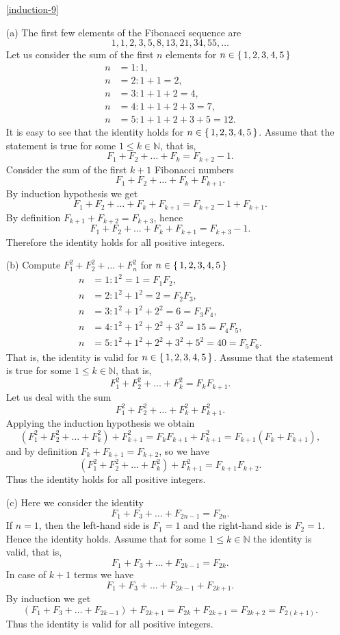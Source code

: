 \begin{enumerate}
\item[\ref{induction-9}]

(a) The first few elements of the Fibonacci sequence are
$$
1,1,2,3,5,8,13,21,34,55,\ldots
$$
Let us consider the sum of the first $n$ elements for $n\in\left\{\,1,2,3,4,5\,\right\}$
\begin{align*}
n&=1: 1,\\
n&=2: 1+1=2,\\
n&=3: 1+1+2=4,\\
n&=4: 1+1+2+3=7,\\
n&=5: 1+1+2+3+5=12.
\end{align*}
It is easy to see that the identity holds for $n\in\left\{\,1,2,3,4,5\,\right\}$. Assume that the statement is true for some $1\leq k\in\mathbb{N}$,
that is, 
$$
F_1+F_2+\ldots+F_k=F_{k+2}-1.
$$
Consider the sum of the first $k+1$ Fibonacci numbers
$$
F_1+F_2+\ldots+F_k+F_{k+1}.
$$
By induction hypothesis we get
$$
F_1+F_2+\ldots+F_k+F_{k+1}=F_{k+2}-1+F_{k+1}.
$$
By definition $F_{k+1}+F_{k+2}=F_{k+3}$, hence
$$
F_1+F_2+\ldots+F_k+F_{k+1}=F_{k+3}-1.
$$
Therefore the identity holds for all positive integers.

(b) Compute $F_1^2+F_2^2+\ldots+F_n^2$ for $n\in\left\{\,1,2,3,4,5\,\right\}$
\begin{align*}
n&=1: 1^2=1=F_1F_2,\\
n&=2: 1^2+1^2=2=F_2F_3,\\
n&=3: 1^2+1^2+2^2=6=F_3F_4,\\
n&=4: 1^2+1^2+2^2+3^2=15=F_4F_5,\\
n&=5: 1^2+1^2+2^2+3^2+5^2=40=F_5F_6.
\end{align*}
That is, the identity is valid for $n\in\left\{\,1,2,3,4,5\,\right\}$. Assume that the statement is true for some $1\leq k\in\mathbb{N}$,
that is, 
$$
F_1^2+F_2^2+\ldots+F_k^2=F_kF_{k+1}.
$$
Let us deal with the sum
$$
F_1^2+F_2^2+\ldots+F_k^2+F_{k+1}^2.
$$
Applying the induction hypothesis we obtain
$$
(F_1^2+F_2^2+\ldots+F_k^2)+F_{k+1}^2=F_kF_{k+1}+F_{k+1}^2=F_{k+1}(F_k+F_{k+1}),
$$
and by definition $F_k+F_{k+1}=F_{k+2}$, so we have
$$
(F_1^2+F_2^2+\ldots+F_k^2)+F_{k+1}^2=F_{k+1}F_{k+2}.
$$
Thus the identity holds for all positive integers.

(c) Here we consider the identity
$$
F_1+F_3+\ldots+F_{2n-1}=F_{2n}.
$$
If $n=1$, then the left-hand side is $F_1=1$ and the right-hand side is $F_2=1$. Hence the identity holds.
Assume that for some $1\leq k\in\mathbb{N}$ the identity is valid, that is, 
$$
F_1+F_3+\ldots+F_{2k-1}=F_{2k}.
$$
In case of $k+1$ terms we have
$$
F_1+F_3+\ldots+F_{2k-1}+F_{2k+1}.
$$
By induction we get
$$
(F_1+F_3+\ldots+F_{2k-1})+F_{2k+1}=F_{2k}+F_{2k+1}=F_{2k+2}=F_{2(k+1)}.
$$
Thus the identity is valid for all positive integers.


\end{enumerate}
